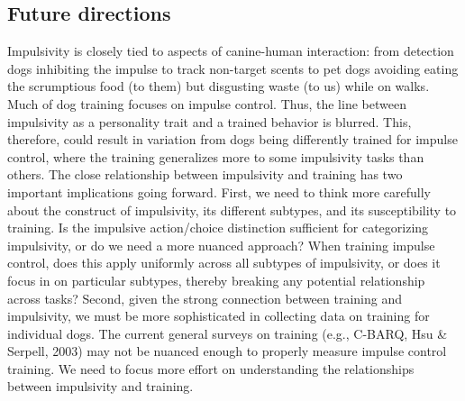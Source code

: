 \documentclass[
  ,pub,floatsintext]{apa6}
\begin{document}
\hypertarget{future-directions}{%
\subsection{Future directions}\label{future-directions}}

Impulsivity is closely tied to aspects of canine-human interaction: from detection dogs inhibiting the impulse to track non-target scents to pet dogs avoiding eating the scrumptious food (to them) but disgusting waste (to us) while on walks. Much of dog training focuses on impulse control. Thus, the line between impulsivity as a personality trait and a trained behavior is blurred. This, therefore, could result in variation from dogs being differently trained for impulse control, where the training generalizes more to some impulsivity tasks than others. The close relationship between impulsivity and training has two important implications going forward. First, we need to think more carefully about the construct of impulsivity, its different subtypes, and its susceptibility to training. Is the impulsive action/choice distinction sufficient for categorizing impulsivity, or do we need a more nuanced approach? When training impulse control, does this apply uniformly across all subtypes of impulsivity, or does it focus in on particular subtypes, thereby breaking any potential relationship across tasks? Second, given the strong connection between training and impulsivity, we must be more sophisticated in collecting data on training for individual dogs. The current general surveys on training (e.g., C-BARQ, Hsu \& Serpell, 2003) may not be nuanced enough to properly measure impulse control training. We need to focus more effort on understanding the relationships between impulsivity and training.
\end{document}
